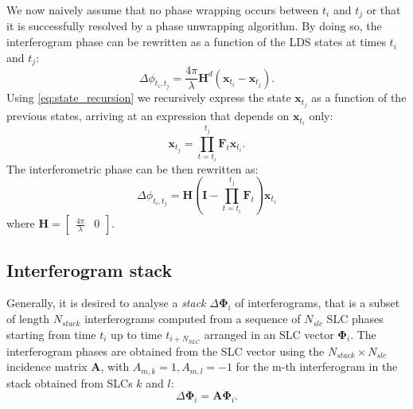 \documentclass{article}
\begin{document}
We now naively assume that no phase wrapping occurs between $t_{i}$ and $t_{j}$ or that it is successfully resolved by a phase unwrapping algorithm. By doing so, the interferogram phase can be rewritten as a function of the LDS states at times $t_{i}$ and $t_{j}$:
\begin{equation}\label{ifgram_phase}
	\Delta\phi_{t_i,t_j} = \frac{4\pi}{\lambda} \mathbf{H}^d \left( \mathbf{x}_{t_i} - \mathbf{x}_{t_j} \right).
\end{equation}		
Using \autoref{eq:state_recursion} we recursively express the state $\mathbf{x}_{t_j}$ as a function of the previous states, arriving at an expression that depends on $\mathbf{x}_{t_i}$ only:
\begin{equation}
	\mathbf{x}_{t_j} = \prod_{t=t_{i}}^{t_j}\mathbf{F}_t \mathbf{x}_{t_i}.
\end{equation}
The interferometric phase can be then rewritten as:
\begin{equation}
	\Delta\phi_{t_i,t_j} = \mathbf{H} \left(\mathbf{I} - \prod_{t=t_{i}}^{t_j}\mathbf{F}_t \right)\mathbf{x}_{t_i}
\end{equation}	
where $\mathbf{H} = 
	\begin{bmatrix}
	 \frac{4\pi}{\lambda} & 0
	\end{bmatrix}$.
\subsection{Interferogram stack}
Generally, it is desired to analyse a \emph{stack} $\Delta\mathbf{\Phi}_{i}$  of interferograms, that is a subset of length $N_{stack}$ interferograms computed from a sequence of $N_{slc}$ SLC phases starting from time $t_i$ up to time $t_{i+N_{SLC}}$ arranged in an SLC vector $\mathbf{\Phi}_i$. The interferogram phases  are obtained from the SLC vector using the  $N_{stack}\times N_{slc}$ incidence matrix $\mathbf{A}$, with $A_{m,k} = 1, A_{m,l}=-1$ for the m-th interferogram in the stack obtained from SLCs $k$ and $l$\cite{Agram2015}:
\begin{equation}
	 \Delta\mathbf{\Phi}_{i} = \mathbf{A} \mathbf{\Phi}_{i}.
\end{equation}
\end{document}
